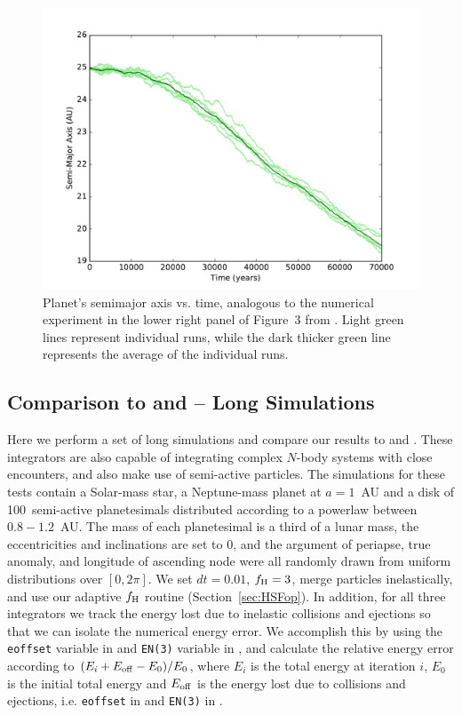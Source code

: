 \begin{figure}
\centerline{\includegraphics[scale=0.45]{chap4/images/Kirsh_avg_a.pdf}}
\caption{
Planet's semimajor axis vs. time, analogous to the numerical experiment in the lower right panel of Figure~3 from  \citet{Kirsh2009}. 
Light green lines represent individual runs, while the dark thicker green line represents the average of the individual runs. 
 }
\label{fig:Kirsh}
\end{figure}

\subsection{Comparison to \mercury and \symba -- Long Simulations}
Here we perform a set of long simulations and compare our results to \mercury and \symba.
These integrators are also capable of integrating complex $N$-body systems with close encounters, and also make use of semi-active particles.
The simulations for these tests contain a Solar-mass star, a Neptune-mass planet at $a=1$~AU and a disk of 100~semi-active planetesimals distributed according to a powerlaw between $0.8 - 1.2$~AU. 
The mass of each planetesimal is a third of a lunar mass, the eccentricities and inclinations are set to 0, and the argument of periapse, true anomaly, and longitude of ascending node were all randomly drawn from uniform distributions over $[0, 2\pi]$.
We set $dt = 0.01$, $f_{\rm H} = 3$, merge particles inelastically, and use our adaptive $f_{\rm H}$ routine (Section~\ref{sec:HSFop}). 
In addition, for all three integrators we track the energy lost due to inelastic collisions and ejections so that we can isolate the numerical energy error. 
We accomplish this by using the \texttt{eoffset} variable in \symba and \texttt{EN(3)} variable in \mercury, and calculate the relative energy error according to $(E_{i} + E_{\rm off} - E_{\rm 0})/E_{0}$, where $E_i$ is the total energy at iteration $i$, $E_0$ is the initial total energy and $E_{\rm off}$ is the energy lost due to collisions and ejections, i.e. \texttt{eoffset} in \symba and \texttt{EN(3)} in \mercury. 

